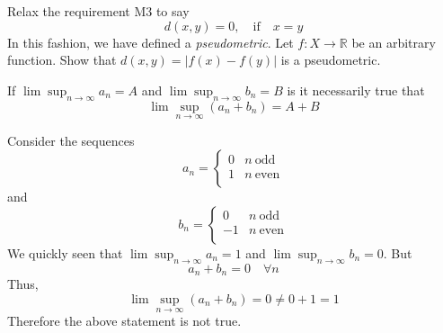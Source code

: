 \documentclass{homework}
\begin{document}
\begin{problem}[2-9]
  Relax the requirement M3 to say
  \[d(x, y) = 0, \quad \text{if} \quad x = y\]
  In this fashion, we have defined a \textit{pseudometric}. Let $f: X \rightarrow \mathds{R}$ be an arbitrary function. Show that $d(x, y) = |f(x) - f(y)|$ is a pseudometric.
\end{problem}

\begin{solution}
\end{solution}

\begin{problem}[2-19]
  If $\lim \sup_{n\rightarrow\infty} a_n= A$ and $\lim \sup_{n\rightarrow\infty} b_n= B$ is it necessarily true that
  \[\lim \sup_{n\rightarrow\infty} (a_n + b_n) = A + B\]
\end{problem}

\begin{solution}
  Consider the sequences 
  \[a_n = \begin{cases} 
      0 & n\ \text{odd} \\
      1 & n\ \text{even}\\
   \end{cases}
  \]
  and
  \[b_n = \begin{cases} 
      0 & n\ \text{odd} \\
      -1 & n\ \text{even}\\
   \end{cases}
  \]
  We quickly seen that $\lim \sup_{n\rightarrow\infty} a_n= 1$ and $\lim \sup_{n\rightarrow\infty} b_n= 0$. But
  \[ a_n + b_n = 0 \quad \forall n\]
  Thus, 
  \[\lim \sup_{n\rightarrow\infty} (a_n + b_n)  = 0 \neq 0 + 1 = 1\]
  Therefore the above statement is not true.
\end{solution}
\end{document}
